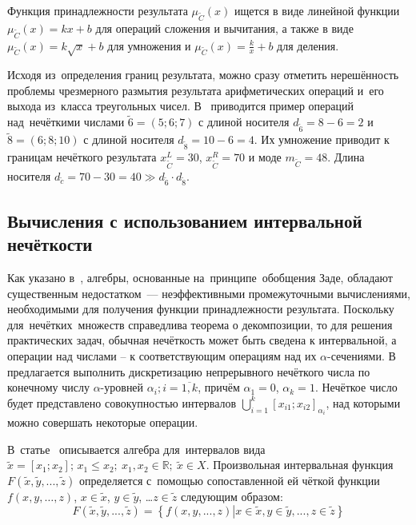 Функция принадлежности результата $\mu_{\tilde C}\left( x \right)$ ищется в виде линейной функции $\mu_{\tilde C}\left( x \right)=kx+b$ для операций сложения и вычитания, а также в виде $\mu_{\tilde C}\left( x \right)=k\sqrt{x}+b$ для умножения и $\mu_{\tilde C}\left( x \right)=\frac{k}{x}+b$ для деления.

Исходя из~определения границ результата, можно сразу отметить нерешённость проблемы чрезмерного размытия результата арифметических операций и~его выхода из~класса треугольных чисел. В~\cite{Borisov_Krumberg_Riga} приводится пример операций над~нечёткими числами $\tilde{6}=\left( 5;6;7 \right)$ с длиной носителя ${{d}_{{\tilde{6}}}}=8-6=2$ и $\tilde{8}=\left( 6;8;10 \right)$ с длиной носителя ${{d}_{{\tilde{8}}}}=10-6=4$. Их умножение приводит к границам нечёткого результата $x_{{\tilde{C}}}^{L}=30$, $x_{{\tilde{C}}}^{R}=70$ и моде ${{m}_{{\tilde{C}}}}=48$. Длина носителя ${{d}_{{\tilde{c}}}}=70-30=40\gg {{d}_{{\tilde{6}}}}\cdot {{d}_{{\tilde{8}}}}$.

\subsection{Вычисления с использованием интервальной нечёткости}
Как указано в~\cite{Rotshtein, Borisov_Krumberg_Riga, Evdokimov}, алгебры, основанные на~принципе~обобщения Заде, обладают существенным недостатком~--- неэффективными промежуточными вычислениями, необходимыми для получения функции принадлежности результата. Поскольку для~нечётких~множеств справедлива теорема о декомпозиции, то для решения практических задач, обычная нечёткость может быть сведена к интервальной, а операции над числами – к соответствующим операциям над их $\alpha$-сечениями. В~\cite{Borisov_Krumberg_Riga} предлагается выполнить дискретизацию непрерывного нечёткого числа по конечному числу $\alpha$-уровней $\alpha_i;i=\overline{1,k}$, причём $\alpha_1=0$, $\alpha_k=1$. Нечёткое число будет представлено совокупностью интервалов $\displaystyle \bigcup\limits_{i=1}^{k}{{{\left[ x_{i1}; x_{i2} \right]}_{\alpha_i}}}$, над которыми можно совершать некоторые операции.

В~статье~\cite{Levin} описывается алгебра для~интервалов вида $\tilde{x}=\left[ {{x}_{1}};{{x}_{2}} \right];\,{{x}_{1}}\le {{x}_{2}};\ x_1, x_2\in \mathbb{R};\ \tilde{x}\in X$. Произвольная интервальная функция $F\left( \tilde{x},\tilde{y},...,\tilde{z} \right)$ определяется с~помощью сопоставленной ей чёткой функции $f\left( x,y,\ldots,z \right)$, $x\in \tilde{x}$, $y\in \tilde{y}$, …$z\in \tilde{z}$ следующим образом:
\begin{equation}
\label{eq:interval-function}
	F\left( \tilde{x},\tilde{y},...,\tilde{z} \right)=\left\{ f\left( x,y,...,z \right)\left| x\in \tilde{x},y\in \tilde{y},...,z\in \tilde{z} \right. \right\}
\end{equation}


